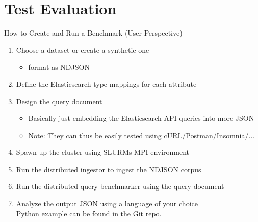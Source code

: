\documentclass[compress,aspectratio=169]{beamer}
\begin{document}
	\section{Test Evaluation}
  \begin{frame}{How to Create and Run a Benchmark (User Perspective)}
    \begin{enumerate}
      \item Choose a dataset or create a synthetic one
        \begin{itemize}
          \item format as NDJSON
        \end{itemize}
        \pause
      \item Define the Elasticsearch type mappings for each attribute
        \pause
      \item Design the query document
        \begin{itemize}
          \item Basically just embedding the Elasticsearch API queries into more JSON
          \item Note: They can thus be easily tested using cURL/Postman/Insomnia/...
        \end{itemize}
        \pause
      \item Spawn up the cluster using SLURMs MPI environment
        \pause
      \item Run the distributed ingestor to ingest the NDJSON corpus
        \pause
      \item Run the distributed query benchmarker using the query document
        \pause
      \item Analyze the output JSON using a language of your choice\\
        Python example can be found in the Git repo.
    \end{enumerate}
  \end{frame}
\end{document}
